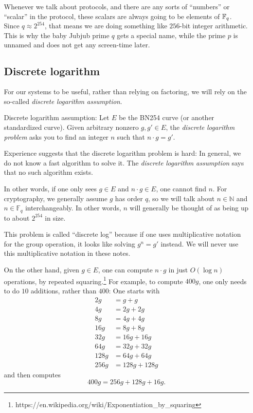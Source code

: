 \begin{remark}
Whenever we talk about protocols, and there are any sorts of
``numbers'' or ``scalar'' in the protocol,
these scalars are always going to be elements of $\mathbb{F}_q$.
Since $q \approx 2^{254}$,
that means we are doing something like $256$-bit integer arithmetic.
This is why the baby Jubjub prime $q$ gets a special name,
while the prime $p$ is unnamed and does not get any screen-time later.
\end{remark}

\subsection{Discrete logarithm}\label{discretelog}

For our systems to be useful, rather than relying on factoring, we will
rely on the so-called \emph{discrete logarithm assumption}.

\begin{assumption}
\label{ddh}
Discrete logarithm assumption: Let \(E\) be the BN254 curve (or another
standardized curve). Given arbitrary nonzero \(g,g' \in E\), the
\emph{discrete logarithm problem} asks you to find an integer \(n\) such
that \(n \cdot g = g'\).

Experience suggests that the discrete logarithm problem is hard: In
general, we do not know a fast algorithm to solve it. The \emph{discrete
logarithm assumption} says that no such algorithm exists.
\end{assumption}

In other words, if one only sees \(g \in E\) and \(n \cdot g \in E\),
one cannot find \(n\). For cryptography, we generally assume \(g\) has
order \(q\), so we will talk about \(n \in {\mathbb{N}}\) and
\(n \in {\mathbb{F}}_{q}\) interchangeably. In other words, \(n\) will
generally be thought of as being up to about \(2^{254}\) in size.

\begin{remark}
This problem is called ``discrete log'' because if one uses multiplicative notation
for the group operation, it looks like solving $g^n = g'$ instead.
We will never use this multiplicative notation in these notes.
\end{remark}

On the other hand, given \(g \in E\), one can compute \(n \cdot g\) in
just \(O( \log n )\) operations, by repeated
squaring.\footnote{https://en.wikipedia.org/wiki/Exponentiation\_by\_squaring}
For example, to compute \(400g\), one only needs to do \(10\) additions,
rather than \(400\): One starts with \[\begin{aligned}
2g & = g + g \\
4g & = 2g + 2g \\
8g & = 4g + 4g \\
16g & = 8g + 8g \\
32g & = 16g + 16g \\
64g & = 32g + 32g \\
128g & = 64g + 64g \\
256g & = 128g + 128g
\end{aligned}\] and then computes \[400g = 256g + 128g + 16g.\]

